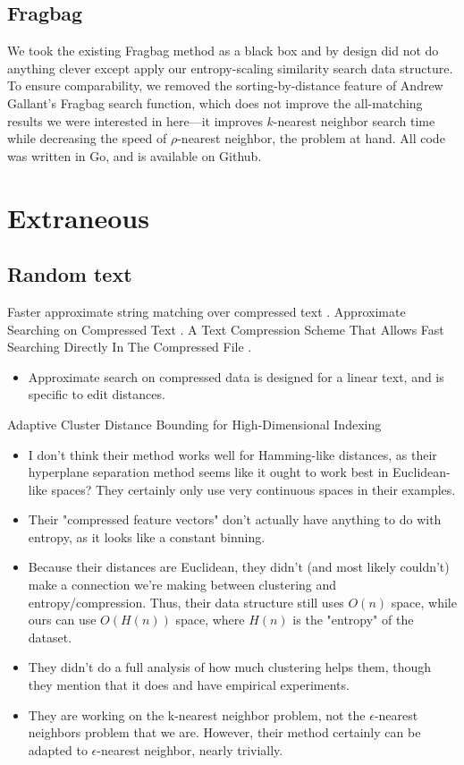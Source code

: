 \documentclass{amsbook}
\theoremstyle{definition}
\theoremstyle{remark}
\numberwithin{equation}{section}
\begin{document}
\section{Fragbag}
We took the existing Fragbag method as a black box and by design did not do anything clever except apply our entropy-scaling similarity search data structure.
To ensure comparability, we removed the sorting-by-distance feature of Andrew Gallant's Fragbag search function, which does not improve the all-matching results we were interested in here---it improves $k$-nearest neighbor search time while decreasing the speed of $\rho$-nearest neighbor, the problem at hand.
All code was written in Go, and is available on Github.




\appendix
\chapter{Extraneous}
\section{Random text}

Faster approximate string matching over compressed text \cite{navarro2001faster}.
Approximate Searching on Compressed Text \cite{perez2005approximate}.
A Text Compression Scheme That Allows Fast Searching Directly In The Compressed File \cite{manber93atext}.
\begin{itemize}
\item Approximate search on compressed data is designed for a linear text, and is specific to edit distances.
\end{itemize}

Adaptive Cluster Distance Bounding for High-Dimensional Indexing \cite{ramaswamy2011adaptive}
\begin{itemize}
\item I don't think their method works well for Hamming-like distances, as
   their hyperplane separation method seems like it ought to work best
   in Euclidean-like spaces? They certainly only use very continuous
   spaces in their examples.
\item Their "compressed feature vectors" don't actually have anything to do
   with entropy, as it looks like a constant binning.
\item Because their distances are Euclidean, they didn't (and most likely
   couldn't) make a connection we're making between clustering and
   entropy/compression. Thus, their data structure still uses $O(n)$
   space, while ours can use $O(H(n))$ space, where $H(n)$ is the "entropy"
   of the dataset.
\item They didn't do a full analysis of how much clustering helps them,
   though they mention that it does and have empirical experiments.
\item They are working on the k-nearest neighbor problem, not the
   $\epsilon$-nearest neighbors problem that we are. However, their method
   certainly can be adapted to $\epsilon$-nearest neighbor, nearly
   trivially.
\end{itemize}
\end{document}
